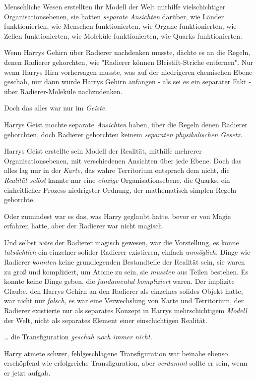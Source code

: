 {Menschliche Wesen erstellten ihr Modell der Welt mithilfe vielschichtiger Organisationsebenen, sie hatten \emph{separate Ansichten} darüber, wie Länder funktionierten, wie Menschen funktionierten, wie Organe funktionierten, wie Zellen funktionierten, wie Moleküle funktionierten, wie Quarks funktionierten.

Wenn Harrys Gehirn über Radierer nachdenken musste, dächte es an die Regeln, denen Radierer gehorchten, wie "Radierer können Bleistift-Striche entfernen". Nur wenn Harrys Hirn vorhersagen musste, was auf der niedrigeren chemischen Ebene geschah, nur dann würde Harrys Gehirn anfangen - als sei es ein separater Fakt - über Radierer-Moleküle nachzudenken.

Doch das alles war nur im \emph{Geiste.}

Harrys Geist mochte separate \emph{Ansichten} haben, über die Regeln denen Radierer gehorchten, doch Radierer gehorchten keinem \emph{separaten} \emph{physikalischen} \emph{Gesetz.}

Harrys Geist erstellte sein Modell der Realität, mithilfe mehrerer Organisationsebenen, mit verschiedenen Ansichten über jede Ebene. Doch das alles lag nur in der \emph{Karte,} das wahre Territorium entsprach dem nicht, die \emph{Realität selbst} kannte nur eine \emph{einzige} Organisationsebene, die Quarks, ein einheitlicher Prozess niedrigster Ordnung, der mathematisch simplen Regeln gehorchte.

Oder zumindest war es das, was Harry geglaubt hatte, bevor er von Magie erfahren hatte, aber der Radierer war nicht magisch.

Und selbst \emph{wäre} der Radierer magisch gewesen, war die Vorstellung, es könne \emph{tatsächlich} ein einzelner solider Radierer existieren, einfach \emph{unmöglich.} Dinge wie Radierer \emph{konnten} keine grundlegenden Bestandteile der Realität sein, sie waren zu groß und kompliziert, um Atome zu sein, sie \emph{mussten} aus Teilen bestehen. Es konnte keine Dinge geben, die \emph{fundamental kompliziert} waren. Der implizite Glaube, den Harrys Gehirn an den Radierer als einzelnes solides Objekt hatte, war nicht nur \emph{falsch,} es war eine Verwechslung von Karte und Territorium, der Radierer existierte nur als separates Konzept in Harrys mehrschichtigem \emph{Modell} der Welt, nicht als separates Element einer einschichtigen Realität.

… die Transfiguration \emph{geschah noch immer nicht.}

Harry atmete schwer, fehlgeschlagene Transfiguration war beinahe ebenso erschöpfend wie erfolgreiche Transfiguration, aber \emph{verdammt} sollte er sein, wenn er jetzt aufgab.

}
